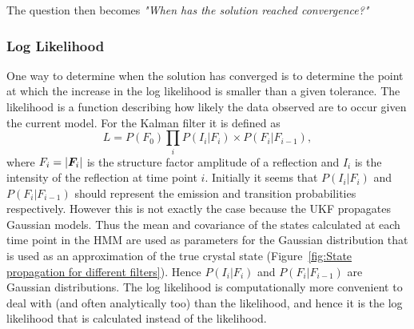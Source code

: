 The question then becomes \textit{"When has the solution reached convergence?"}

\subsubsection{Log Likelihood}
\label{subs:Log Likelihood}
One way to determine when the solution has converged is to determine the point at which the increase in the log likelihood is smaller than a given tolerance.
The likelihood is a function describing how likely the data observed are to occur given the current model.
For the Kalman filter it is defined as \cite{cressie2015statistics}
\begin{equation}
    L = P(F_0) \prod_i P(I_i | F_i) \times P( F_i | F_{i-1}),
    \label{eq:FBA likelihood function}
\end{equation}
where $F_i = |\boldsymbol{F}_i|$ is the structure factor amplitude of a reflection and $I_i$ is the intensity of the reflection at time point $i$.
Initially it seems that $P(I_i | F_i)$ and $P( F_i | F_{i-1})$ should represent the emission and transition probabilities respectively.
However this is not exactly the case because the UKF propagates Gaussian models.
Thus the mean and covariance of the states calculated at each time point in the HMM are used as parameters for the Gaussian distribution that is used as an approximation of the true crystal state (Figure~\ref{fig:State propagation for different filters}).
Hence $P(I_i | F_i)$ and $P( F_i | F_{i-1})$ are Gaussian distributions.
The log likelihood is computationally more convenient to deal with (and often analytically too) than the likelihood, and hence it is the log likelihood that is calculated instead of the likelihood.
